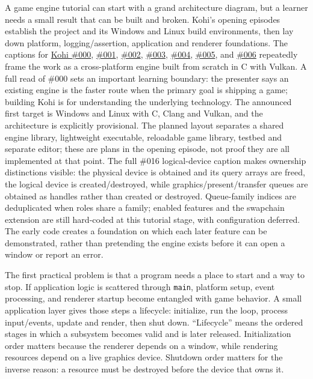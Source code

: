 A game engine tutorial can start with a grand architecture diagram, but a learner needs a small result that can be built and broken. Kohi's opening episodes establish the project and its Windows and Linux build environments, then lay down platform, logging/assertion, application and renderer foundations. The captions for \href{https://www.youtube.com/watch?v=teg23SJlyl8}{Kohi \#000}, \href{https://www.youtube.com/watch?v=F6_WdnzQIQ4}{\#001}, \href{https://www.youtube.com/watch?v=NIv1mygBOcg}{\#002}, \href{https://www.youtube.com/watch?v=l9e8PJskYnI}{\#003}, \href{https://www.youtube.com/watch?v=ojEPsZFPj2Q}{\#004}, \href{https://www.youtube.com/watch?v=nGgvWzoCsyk}{\#005}, and \href{https://www.youtube.com/watch?v=jEbqCf-MsZs}{\#006} repeatedly frame the work as a cross-platform engine built from scratch in C with Vulkan. A full read of \#000 sets an important learning boundary: the presenter says an existing engine is the faster route when the primary goal is shipping a game; building Kohi is for understanding the underlying technology. The announced first target is Windows and Linux with C, Clang and Vulkan, and the architecture is explicitly provisional. The planned layout separates a shared engine library, lightweight executable, reloadable game library, testbed and separate editor; these are plans in the opening episode, not proof they are all implemented at that point. The full \#016 logical-device caption makes ownership distinctions visible: the physical device is obtained and its query arrays are freed, the logical device is created/destroyed, while graphics/present/transfer queues are obtained as handles rather than created or destroyed. Queue-family indices are deduplicated when roles share a family; enabled features and the swapchain extension are still hard-coded at this tutorial stage, with configuration deferred. The early code creates a foundation on which each later feature can be demonstrated, rather than pretending the engine exists before it can open a window or report an error.

The first practical problem is that a program needs a place to start and a way to stop. If application logic is scattered through \texttt{main}, platform setup, event processing, and renderer startup become entangled with game behavior. A small application layer gives those steps a lifecycle: initialize, run the loop, process input/events, update and render, then shut down. ``Lifecycle'' means the ordered stages in which a subsystem becomes valid and is later released. Initialization order matters because the renderer depends on a window, while rendering resources depend on a live graphics device. Shutdown order matters for the inverse reason: a resource must be destroyed before the device that owns it.

